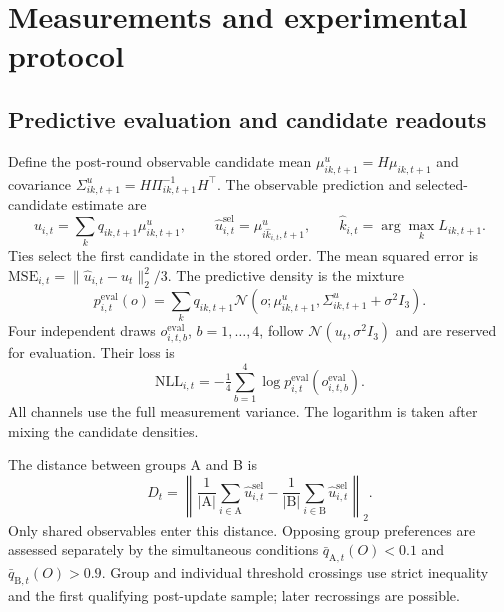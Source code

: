 \documentclass[runningheads]{llncs}
\newcommand{\Normal}{\mathcal N}
\begin{document}
\section{Measurements and experimental protocol}
\label{app:protocol}
\subsection{Predictive evaluation and candidate readouts}
Define the post-round observable candidate mean
$\mu^u_{ik,t+1}=H\mu_{ik,t+1}$ and covariance
$\Sigma^u_{ik,t+1}=H\Pi_{ik,t+1}^{-1}H^\top$. The observable prediction and
selected-candidate estimate are
\begin{equation}
 \hat u_{i,t}=\sum_kq_{ik,t+1}\mu^u_{ik,t+1},\qquad
 \hat u^{\mathrm{sel}}_{i,t}=\mu^u_{i\hat k_{i,t},t+1},\qquad
 \hat k_{i,t}=\arg\max_kL_{ik,t+1}.
 \label{eq:observable-readouts}
\end{equation}
Ties select the first candidate in the stored order. The mean squared error is
$\mathrm{MSE}_{i,t}=\|\hat u_{i,t}-u_t\|_2^2/3$. The predictive density is the
mixture
\begin{equation}
 p^{\mathrm{eval}}_{i,t}(o)=\sum_kq_{ik,t+1}
     \Normal(o;\mu^u_{ik,t+1},\Sigma^u_{ik,t+1}+\sigma^2I_3).
 \label{eq:evaluation-mixture}
\end{equation}
Four independent draws $o^{\mathrm{eval}}_{i,t,b}$, $b=1,\ldots,4$, follow
$\Normal(u_t,\sigma^2I_3)$ and are reserved for evaluation. Their loss is
\begin{equation}
 \mathrm{NLL}_{i,t}=-\tfrac14\sum_{b=1}^4
          \log p^{\mathrm{eval}}_{i,t}(o^{\mathrm{eval}}_{i,t,b}).
 \label{eq:nll}
\end{equation}
All channels use the full measurement variance. The logarithm is taken after
mixing the candidate densities.

The distance between groups A and B is
\begin{equation}
 D_t=\left\|\frac1{|\mathrm A|}\sum_{i\in\mathrm A}\hat u^{\mathrm{sel}}_{i,t}
       -\frac1{|\mathrm B|}\sum_{i\in\mathrm B}\hat u^{\mathrm{sel}}_{i,t}
       \right\|_2.
 \label{eq:camp-distance}
\end{equation}
Only shared observables enter this distance. Opposing group preferences are
assessed separately by the simultaneous conditions
$\bar q_{\mathrm A,t}(O)<0.1$ and $\bar q_{\mathrm B,t}(O)>0.9$.
Group and individual threshold crossings use strict inequality and the first
qualifying post-update sample; later recrossings are possible.
\end{document}
